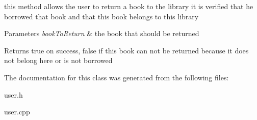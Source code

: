 this method allows the user to return a book to the library it is verified that he borrowed that book and that this book belongs to this library


\begin{DoxyParams}{Parameters}
{\em book\+To\+Return} & the book that should be returned \\
\hline
\end{DoxyParams}
\begin{DoxyReturn}{Returns}
true on success, false if this book can not be returned because it does not belong here or is not borrowed 
\end{DoxyReturn}


The documentation for this class was generated from the following files\+:\begin{DoxyCompactItemize}
\item 
user.\+h\item 
user.\+cpp\end{DoxyCompactItemize}
